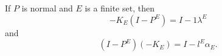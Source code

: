 If $P$ is normal and $E$ is a finite set, then
$$-K_E(I - P^E) = I - 1\lambda^E$$
and
$$(I - P^E)(-K_E) = I - l^E\alpha_E.$$
